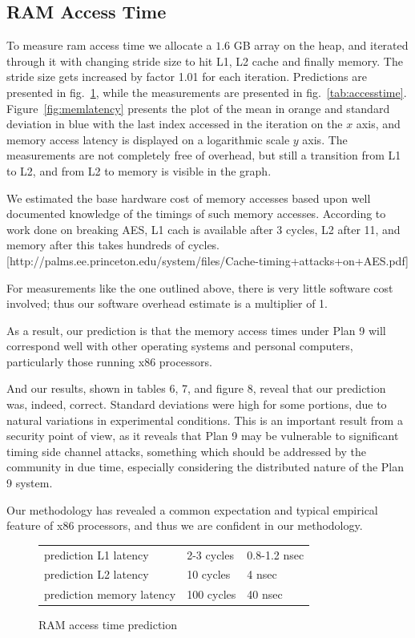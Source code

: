 \documentclass[letterpaper,twocolumn,10pt]{article}
\begin{document}
\subsection{RAM Access Time}

To measure ram access time we allocate a $1.6$ GB array on the heap, and iterated through it with changing stride size to hit L1, L2 cache and finally memory. The stride size gets increased by factor 1.01 for each iteration. Predictions are presented in fig.~\ref{tab:accesstimepred}, while the measurements are presented in fig.~\ref{tab:accesstime}. Figure~\ref{fig:memlatency} presents the plot of the mean in orange and standard deviation in blue with the last index accessed in the iteration on the $x$ axis, and memory access latency is displayed on a logarithmic scale $y$ axis. The measurements are not completely free of overhead, but still a transition from L1 to L2, and from L2 to memory is visible in the graph. 

We estimated the base hardware cost of memory accesses based upon well documented knowledge of the timings of such memory accesses. According to work done on breaking AES, L1 cach is available after 3 cycles, L2 after 11, and memory after this takes hundreds of cycles. [http://palms.ee.princeton.edu/system/files/Cache-timing+attacks+on+AES.pdf]

For measurements like the one outlined above, there is very little software cost involved; thus our software overhead estimate is a multiplier of 1.

As a result, our prediction is that the memory access times under Plan 9 will correspond well with other 
operating systems and personal computers, particularly those running x86 processors.

And our results, shown in tables 6, 7, and figure 8, reveal that our prediction was, indeed, correct. Standard deviations were high for some portions, due to natural variations in experimental conditions. This is an 
important result from a security point of view, as it reveals that Plan 9 may be vulnerable to significant 
timing side channel attacks, something which should be addressed by the community in due time, especially
considering the distributed nature of the Plan 9 system.

Our methodology has revealed a common expectation and typical empirical feature of x86 processors, and 
thus we are confident in our methodology.

\begin{figure}
	\centering
	
	\begin{tabular}{lll}
		prediction L1 latency  & 2-3 cycles & 0.8-1.2 nsec  \\
		prediction L2 latency  & 10 cycles  & 4 nsec \\
		prediction memory latency  & 100 cycles   & 40 nsec \\
	\end{tabular}
	\caption{RAM access time prediction}
	\label{tab:accesstimepred}
\end{figure}
\end{document}
